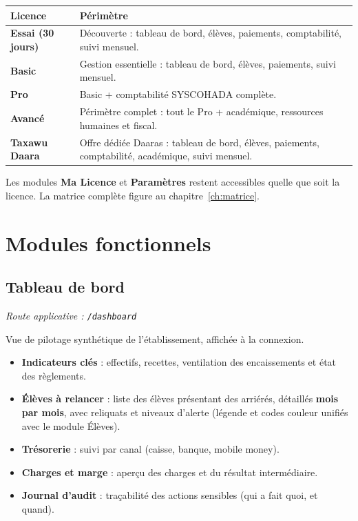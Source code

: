 \documentclass[11pt,a4paper]{report}
\newcommand{\feat}[1]{\item #1}
\newcommand{\modtag}[1]{{\small\color{sagigray}\textit{Route applicative : \texttt{#1}}}}
\begin{document}
\begin{center}
\begin{tabularx}{\textwidth}{>{\bfseries}l X}
\toprule
Licence & Périmètre \\
\midrule
Essai (30 jours) & Découverte : tableau de bord, élèves, paiements, comptabilité, suivi mensuel. \\
Basic & Gestion essentielle : tableau de bord, élèves, paiements, suivi mensuel. \\
Pro & Basic + comptabilité SYSCOHADA complète. \\
Avancé & Périmètre complet : tout le Pro + académique, ressources humaines et fiscal. \\
Taxawu Daara & Offre dédiée Daaras : tableau de bord, élèves, paiements, comptabilité, académique, suivi mensuel. \\
\bottomrule
\end{tabularx}
\end{center}

\noindent Les modules \textbf{Ma Licence} et \textbf{Paramètres} restent
accessibles quelle que soit la licence. La matrice complète figure au
chapitre~\ref{ch:matrice}.

\chapter{Modules fonctionnels}

\section{Tableau de bord}
\modtag{/dashboard}

\noindent Vue de pilotage synthétique de l'établissement, affichée à la
connexion.
\begin{itemize}
\feat{\textbf{Indicateurs clés} : effectifs, recettes, ventilation des
encaissements et état des règlements.}
\feat{\textbf{Élèves à relancer} : liste des élèves présentant des arriérés,
détaillés \textbf{mois par mois}, avec reliquats et niveaux d'alerte
(légende et codes couleur unifiés avec le module Élèves).}
\feat{\textbf{Trésorerie} : suivi par canal (caisse, banque, mobile money).}
\feat{\textbf{Charges et marge} : aperçu des charges et du résultat
intermédiaire.}
\feat{\textbf{Journal d'audit} : traçabilité des actions sensibles
(qui a fait quoi, et quand).}
\end{itemize}
\end{document}
